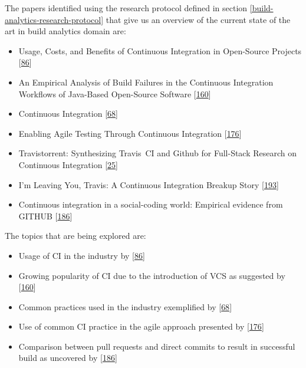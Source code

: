 \documentclass[]{book}
\providecommand{\tightlist}{%
  \setlength{\itemsep}{0pt}\setlength{\parskip}{0pt}}
\begin{document}
The papers identified using the research protocol defined in section
\ref{build-analytics-research-protocol} that give us an overview of the
current state of the art in build analytics domain are:

\begin{itemize}
\tightlist
\item
  Usage, Costs, and Benefits of Continuous Integration in Open-Source
  Projects {[}\protect\hyperlink{ref-hilton2016usage}{86}{]}
\item
  An Empirical Analysis of Build Failures in the Continuous Integration
  Workflows of Java-Based Open-Source Software
  {[}\protect\hyperlink{ref-rausch2017empirical}{160}{]}
\item
  Continuous Integration
  {[}\protect\hyperlink{ref-fowler2006continuous}{68}{]}
\item
  Enabling Agile Testing Through Continuous Integration
  {[}\protect\hyperlink{ref-stolberg2009enabling}{176}{]}
\item
  Travistorrent: Synthesizing Travis~CI and Github for Full-Stack
  Research on Continuous Integration
  {[}\protect\hyperlink{ref-beller2017travistorrent}{25}{]}
\item
  I'm Leaving You, Travis: A Continuous Integration Breakup Story
  {[}\protect\hyperlink{ref-widder2018m}{193}{]}
\item
  Continuous integration in a social-coding world: Empirical evidence
  from GITHUB {[}\protect\hyperlink{ref-vasilescu2014continuous}{186}{]}
\end{itemize}

The topics that are being explored are:

\begin{itemize}
\tightlist
\item
  Usage of CI in the industry by
  {[}\protect\hyperlink{ref-hilton2016usage}{86}{]}
\item
  Growing popularity of CI due to the introduction of VCS as suggested
  by {[}\protect\hyperlink{ref-rausch2017empirical}{160}{]}
\item
  Common practices used in the industry exemplified by
  {[}\protect\hyperlink{ref-fowler2006continuous}{68}{]}
\item
  Use of common CI practice in the agile approach presented by
  {[}\protect\hyperlink{ref-stolberg2009enabling}{176}{]}
\item
  Comparison between pull requests and direct commits to result in
  successful build as uncovered by
  {[}\protect\hyperlink{ref-vasilescu2014continuous}{186}{]}
\end{itemize}
\end{document}
